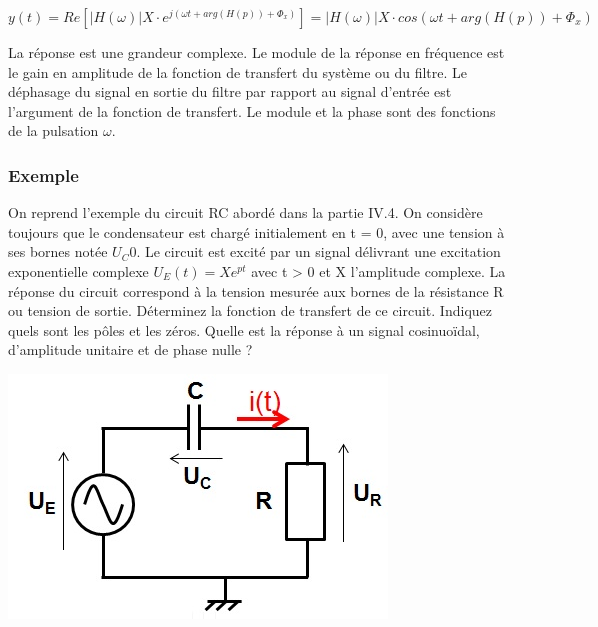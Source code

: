 	\begin{equation}\label{calcul_reponse_fonction_transfert}
	y(t) = Re[|H(\omega)|X\cdot e^{j(\omega t+arg(H(p))+\Phi_{x})}] =|H(\omega)|X\cdot cos(\omega t+arg(H(p))+\Phi_{x})
	\end{equation}
	
	La réponse est une grandeur complexe. Le module de la réponse en fréquence est le gain en amplitude de la fonction de transfert du système ou du filtre. Le déphasage du signal en sortie du filtre par rapport au signal d'entrée est l'argument de la fonction de transfert. Le module et la phase sont des fonctions de la pulsation $\omega$.
	
	
	\subsubsection{Exemple}
	
	\begin{minipage}[l]{0.7\linewidth}
		On reprend l'exemple du circuit RC abordé dans la partie IV.4. On considère toujours que le condensateur est chargé initialement en t = 0, avec une tension à ses bornes notée $U_C0$. Le circuit est excité par un signal délivrant une excitation exponentielle complexe $U_{E}(t)=Xe^{pt}$ avec t > 0 et X l'amplitude complexe. La réponse du circuit correspond à la tension mesurée aux bornes de la résistance R ou tension de sortie. Déterminez la fonction de transfert de ce circuit. Indiquez quels sont les pôles et les zéros. Quelle est la réponse à un signal cosinuoïdal, d'amplitude unitaire et de phase nulle ?	
	\end{minipage} \hfill
	\begin{minipage}[r]{0.4\linewidth}
		\includegraphics[scale=0.5]{images/circuit_RC_reponse_forcee.jpg} 	
	\end{minipage}
	\vspace{0.5\baselineskip}


